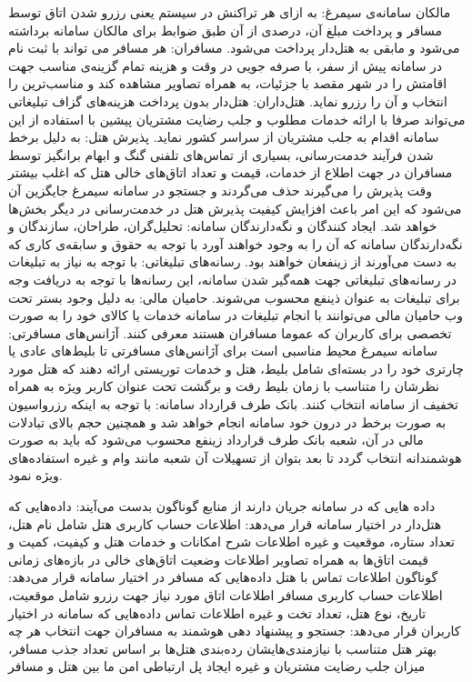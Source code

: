  مالکان سامانه‌ی سیمرغ: به ازای هر تراکنش در سیستم یعنی رزرو شدن اتاق توسط مسافر و پرداخت مبلغ آن، درصدی از آن طبق ضوابط برای مالکان سامانه برداشته می‌شود و مابقی به هتل‌دار پرداخت می‌شود.
 مسافران: هر مسافر می تواند با ثبت نام در سامانه پیش از سفر، با صرفه جویی در وقت و هزینه تمام گزینه‌ی مناسب جهت اقامتش را در شهر مقصد با جزئیات، به همراه تصاویر مشاهده کند و مناسب‌ترین را انتخاب و آن را رزرو نماید.
 هتل‌داران: هتل‌دار بدون پرداخت هزینه‌های گزاف تبلیغاتی می‌تواند صرفا با ارائه خدمات مطلوب و جلب رضایت مشتریان پیشین با استفاده از این سامانه اقدام به جلب مشتریان از سراسر کشور نماید.
 پذیرش هتل: به دلیل برخط شدن فرآیند خدمت‌رسانی، بسیاری از تماس‌های تلفنی گنگ و ابهام برانگیز توسط مسافران در جهت اطلاع از خدمات، قیمت و تعداد اتاق‌های خالی هتل که اغلب بیشتر وقت پذیرش را می‌گیرند حذف می‌گردند و جستجو در سامانه سیمرغ جایگزین آن می‌شود که این امر باعث افزایش کیفیت پذیرش هتل در خدمت‌رسانی در دیگر بخش‌ها خواهد شد.
 ایجاد کنندگان و نگه‌دارندگان سامانه: تحلیل‌گران، طراحان، سازندگان و نگه‌دارندگان سامانه که آن را به وجود خواهند آورد با توجه به حقوق و سابقه‌ی کاری که به دست می‌آورند از زینفعان خواهند بود.
 رسانه‌های تبلیغاتی: با توجه به نیاز به تبلیغات در رسانه‌های تبلیغاتی جهت همه‌گیر شدن سامانه، این رسانه‌ها با توجه به دریافت وجه برای تبلیغات به عنوان ذینفع محسوب می‌شوند.
 حامیان مالی: به دلیل وجود بستر تحت وب حامیان مالی می‌توانند با انجام تبلیغات در سامانه خدمات یا کالای خود را به صورت تخصصی برای کاربران که عموما مسافران هستند معرفی کنند.
 آژانس‌های مسافرتی: سامانه سیمرغ محیط مناسبی است برای آژانس‌های مسافرتی تا بلیط‌های عادی یا چارتری خود را در بسته‌ای شامل بلیط، هتل و خدمات توریستی ارائه دهند که هتل مورد نظرشان را متناسب با زمان بلیط رفت و برگشت تحت عنوان کاربر ویژه به همراه تخفیف از سامانه انتخاب کنند.
 بانک طرف قرارداد سامانه: با توجه به اینکه رزرواسیون به صورت برخط در درون خود سامانه انجام خواهد شد و همچنین حجم بالای تبادلات مالی در آن، شعبه بانک طرف قرارداد زینفع محسوب می‌شود که باید به صورت هوشمندانه انتخاب گردد تا بعد بتوان از تسهیلات آن شعبه مانند وام و غیره استفاده‌های ویژه نمود.



داده هایی که در سامانه جریان دارند از منابع گوناگون بدست می‌آیند:
 داده‌هایی که هتل‌دار در اختیار سامانه قرار می‌دهد:
 اطلاعات حساب کاربری هتل شامل نام هتل، تعداد ستاره، موقعیت و غیره
 اطلاعات شرح امکانات و خدمات هتل و کیفیت، کمیت و قیمت اتاق‌ها به همراه تصاویر
 اطلاعات وضعیت اتاق‌های خالی در بازه‌های زمانی گوناگون
 اطلاعات تماس با هتل
 داده‌هایی که مسافر در اختیار سامانه قرار می‌دهد:
 اطلاعات حساب کاربری مسافر
 اطلاعات اتاق مورد نیاز جهت رزرو شامل موقعیت، تاریخ، نوع هتل، تعداد تخت و غیره
 اطلاعات تماس
 داده‌هایی که سامانه در اختیار کاربران قرار می‌دهد:
 جستجو و پیشنهاد دهی هوشمند به مسافران جهت انتخاب هر چه بهتر هتل متناسب با نیازمندی‌هایشان
 رده‌بندی هتل‌ها بر اساس تعداد جذب مسافر، میزان جلب رضایت مشتریان و غیره
 ایجاد پل ارتباطی امن ما بین هتل و مسافر


